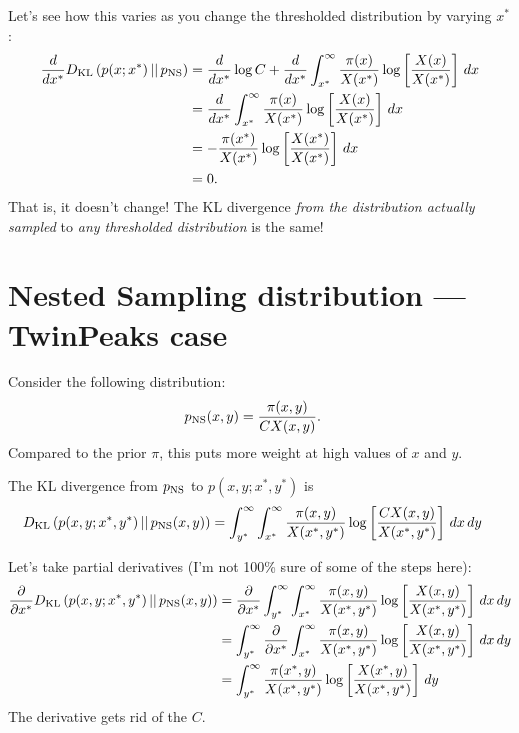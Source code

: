 \documentclass[a4paper, 12pt]{article}
\begin{document}
Let's see how this varies as you change the thresholded distribution
by varying $x^*$:
\begin{align}
\frac{d}{dx^*} D_{\rm KL}\left(p(x; x^*) \,||\, p_{\rm NS}\right)
    &= \frac{d}{dx^*} \log C +
        \frac{d}{dx^*}\int_{x^*}^{\infty} \frac{\pi(x)}{X(x^*)}
            \log \left[\frac{X(x)}{X(x^*)}\right] \, dx \\
    &= \frac{d}{dx^*}\int_{x^*}^{\infty} \frac{\pi(x)}{X(x^*)}
            \log \left[\frac{X(x)}{X(x^*)}\right] \, dx \\
    &= -\frac{\pi(x^*)}{X(x^*)}
            \log \left[\frac{X(x^*)}{X(x^*)}\right] \, dx \\
    &= 0.
\end{align}
That is, it doesn't change! The KL divergence
{\em from the distribution actually sampled} to
{\em any thresholded distribution} is the same!




\section{Nested Sampling distribution --- TwinPeaks case}

Consider the following distribution:
\begin{align}
p_{\rm NS}(x, y) &= \frac{\pi(x, y)}{C X(x, y)}.
\end{align}
Compared to the prior $\pi$, this puts more weight at high values of
$x$ and $y$.

The KL divergence from $p_{\rm NS}$ to $p(x, y ; x^*, y^*)$ is
\begin{align}
D_{\rm KL}\left(p(x, y; x^*, y^*) \,||\, p_{\rm NS}(x, y)\right)
&=
\int_{y^*}^{\infty} \int_{x^*}^{\infty}
    \frac{\pi(x, y)}{X(x^*, y^*)}
    \log \left[\frac{C X(x, y)}{X(x^*, y^*)}\right]
    \, dx \, dy
\end{align}

Let's take partial derivatives (I'm not 100\% sure of some
of the steps here):
\begin{align}
\frac{\partial}{\partial x^*}
D_{\rm KL}\left(p(x, y; x^*, y^*) \,||\, p_{\rm NS}(x, y)\right)
&= \frac{\partial}{\partial x^*}
\int_{y^*}^{\infty} \int_{x^*}^{\infty}
    \frac{\pi(x, y)}{X(x^*, y^*)}
    \log \left[\frac{X(x, y)}{X(x^*, y^*)}\right]
    \, dx \, dy \\
&= \int_{y^*}^{\infty} \frac{\partial}{\partial x^*} \int_{x^*}^{\infty}
    \frac{\pi(x, y)}{X(x^*, y^*)}
    \log \left[\frac{X(x, y)}{X(x^*, y^*)}\right]
    \, dx \, dy \\
&= \int_{y^*}^{\infty}
    \frac{\pi(x^*, y)}{X(x^*, y^*)}
    \log \left[\frac{X(x^*, y)}{X(x^*, y^*)}\right]
    \, dy \\
\end{align}
The derivative gets rid of the $C$.
\end{document}
